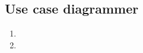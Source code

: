 \subsection{Use case diagrammer}
\begin{center}
	\begin{enumerate}
		\item{ 
			\begin{minipage}[t]{\linewidth}
          			\centering
			\end{minipage}
		}
		\item{ 
			\begin{minipage}[t]{\linewidth}
          			\centering
			\end{minipage}
		}
	\end{enumerate}
\end{center}